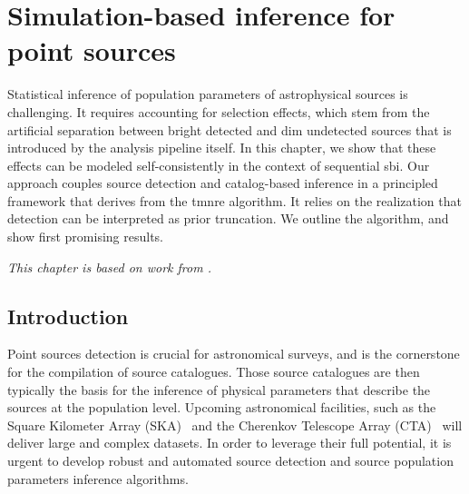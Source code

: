 \chapter{Simulation-based inference for point sources} \label{cha:detection}

Statistical inference of population parameters of astrophysical sources is challenging. It requires accounting for selection effects, which stem from the artificial separation between bright detected and dim undetected sources that is introduced by the analysis pipeline itself. In this chapter, we show that these effects can be modeled self-consistently in the context of sequential \gls*{sbi}. Our approach couples source detection and catalog-based inference in a principled framework that derives from the \gls*{tmnre} algorithm. It relies on the realization that detection can be interpreted as prior truncation. We outline the algorithm, and show first promising results.

\textit{This chapter is based on work from \cite{AnauMontel:2022ppb}.}


\section{Introduction}
\label{sec:ps-intro}

Point sources detection is crucial for astronomical surveys, and is the cornerstone for the compilation of source catalogues. Those source catalogues are then typically the basis for the inference of physical parameters that describe the sources at the population level. Upcoming astronomical facilities, such as the Square Kilometer Array (SKA)~\citep{Weltman:2018zrl} and the Cherenkov Telescope Array (CTA)~\citep{CTAConsortium:2017dvg} will deliver large and complex datasets.  In order to leverage their full potential, it is urgent to develop robust and automated source detection and source population parameters inference algorithms.

